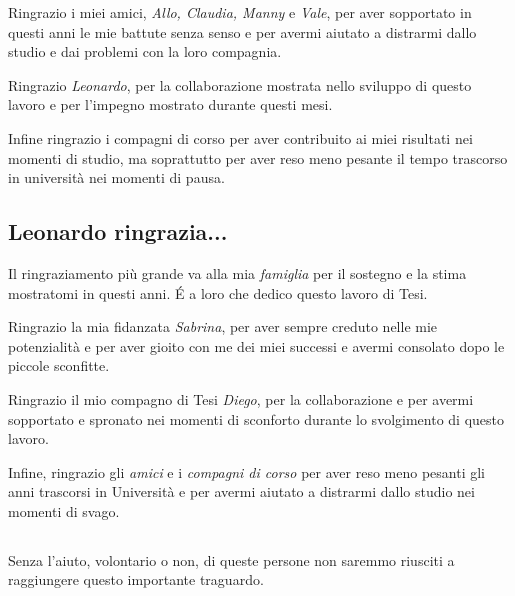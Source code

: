 Ringrazio i miei amici, \textit{Allo, Claudia, Manny} e \textit{Vale}, per aver sopportato in questi anni le mie battute senza senso e per avermi aiutato a distrarmi dallo studio e dai problemi con la loro compagnia.

Ringrazio \textit{Leonardo}, per la collaborazione mostrata nello sviluppo di questo lavoro e per l'impegno mostrato durante questi mesi.

Infine ringrazio i compagni di corso per aver contribuito ai miei risultati nei momenti di studio, ma soprattutto per aver reso meno pesante il tempo trascorso in università nei momenti di pausa.

\subsection*{Leonardo ringrazia...}

Il ringraziamento più grande va alla mia \textit{famiglia} per il sostegno e la stima mostratomi in questi anni. \'E a loro che dedico questo lavoro di Tesi.

Ringrazio la mia fidanzata \textit{Sabrina}, per aver sempre creduto nelle mie potenzialità e per aver gioito con me dei miei successi e avermi consolato dopo le piccole sconfitte. 

Ringrazio il mio compagno di Tesi \textit{Diego}, per la collaborazione e per avermi sopportato e spronato nei momenti di sconforto durante lo svolgimento di questo lavoro.

Infine, ringrazio gli \textit{amici} e i \textit{compagni di corso} per aver reso meno pesanti gli anni trascorsi in Università e per avermi aiutato a distrarmi dallo studio nei momenti di svago.

\subsection*{}
Senza l'aiuto, volontario o non, di queste persone non saremmo riusciti a raggiungere questo importante traguardo.